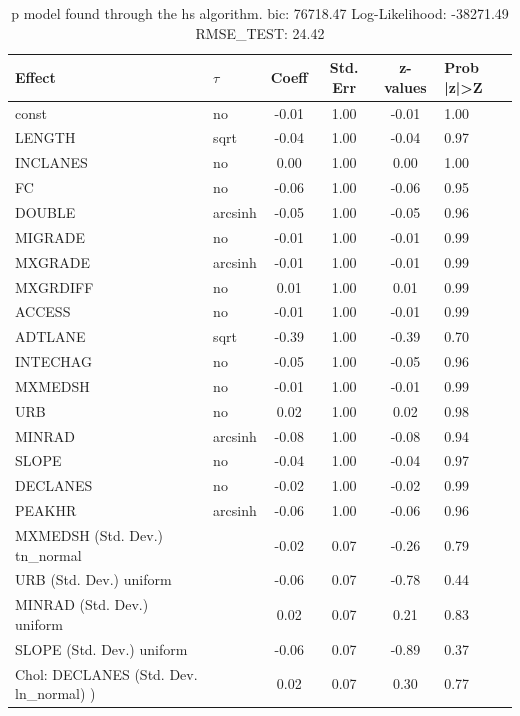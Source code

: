 \begin{table}
	\caption{p model found through the hs algorithm. bic: 76718.47 Log-Likelihood: -38271.49 RMSE_TEST: 24.42}
	\begin{center}
		\begin{tabular}{|l|l|c|c|c|l|}
			\hline
			Effect & $\tau$ & Coeff & Std. Err & z-values & Prob |z|>Z \\
			\hline
			const & no & -0.01 & 1.00 & -0.01 & 1.00 \\
			\hline
			LENGTH & sqrt & -0.04 & 1.00 & -0.04 & 0.97 \\
			\hline
			INCLANES & no & 0.00 & 1.00 & 0.00 & 1.00 \\
			\hline
			FC & no & -0.06 & 1.00 & -0.06 & 0.95 \\
			\hline
			DOUBLE & arcsinh & -0.05 & 1.00 & -0.05 & 0.96 \\
			\hline
			MIGRADE & no & -0.01 & 1.00 & -0.01 & 0.99 \\
			\hline
			MXGRADE & arcsinh & -0.01 & 1.00 & -0.01 & 0.99 \\
			\hline
			MXGRDIFF & no & 0.01 & 1.00 & 0.01 & 0.99 \\
			\hline
			ACCESS & no & -0.01 & 1.00 & -0.01 & 0.99 \\
			\hline
			ADTLANE & sqrt & -0.39 & 1.00 & -0.39 & 0.70 \\
			\hline
			INTECHAG & no & -0.05 & 1.00 & -0.05 & 0.96 \\
			\hline
			MXMEDSH & no & -0.01 & 1.00 & -0.01 & 0.99 \\
			\hline
			URB & no & 0.02 & 1.00 & 0.02 & 0.98 \\
			\hline
			MINRAD & arcsinh & -0.08 & 1.00 & -0.08 & 0.94 \\
			\hline
			SLOPE & no & -0.04 & 1.00 & -0.04 & 0.97 \\
			\hline
			DECLANES & no & -0.02 & 1.00 & -0.02 & 0.99 \\
			\hline
			PEAKHR & arcsinh & -0.06 & 1.00 & -0.06 & 0.96 \\
			\hline
			MXMEDSH (Std. Dev.) tn_normal &  & -0.02 & 0.07 & -0.26 & 0.79 \\
			\hline
			URB (Std. Dev.) uniform &  & -0.06 & 0.07 & -0.78 & 0.44 \\
			\hline
			MINRAD (Std. Dev.) uniform &  & 0.02 & 0.07 & 0.21 & 0.83 \\
			\hline
			SLOPE (Std. Dev.) uniform &  & -0.06 & 0.07 & -0.89 & 0.37 \\
			\hline
			 Chol: DECLANES (Std. Dev. ln_normal) ) &  & 0.02 & 0.07 & 0.30 & 0.77 \\

\end{tabular}
\end{center}
\end{table}
